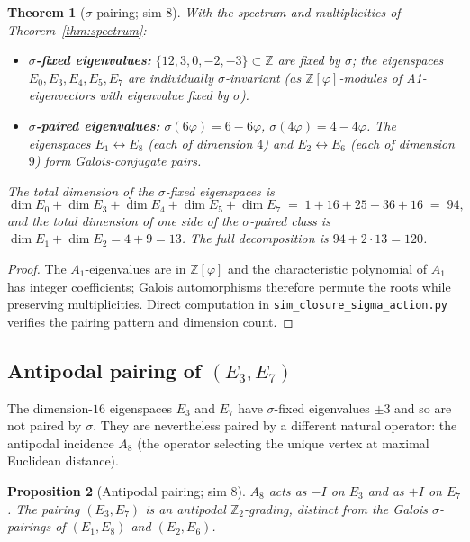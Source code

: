 \documentclass[11pt,a4paper]{article}
\newtheorem{theorem}{Theorem}
\newtheorem{proposition}[theorem]{Proposition}
\theoremstyle{definition}
\theoremstyle{remark}
\newcommand{\Z}{\mathbb{Z}}
\newcommand{\Zphi}{\Z[\varphi]}
\begin{document}
\begin{theorem}[$\sigma$-pairing; sim 8]\label{thm:sigma-pair}
With the spectrum and multiplicities of Theorem~\ref{thm:spectrum}:
\begin{itemize}
  \item \textbf{$\sigma$-fixed eigenvalues:} $\{12, 3, 0, -2, -3\} \subset \Z$ are
    fixed by $\sigma$; the eigenspaces $E_0, E_3, E_4, E_5, E_7$ are
    individually $\sigma$-invariant (as $\Zphi$-modules of A1-eigenvectors with
    eigenvalue fixed by $\sigma$).
  \item \textbf{$\sigma$-paired eigenvalues:}
    $\sigma(6\varphi) = 6-6\varphi$, $\sigma(4\varphi) = 4-4\varphi$. The
    eigenspaces $E_1 \leftrightarrow E_8$ (each of dimension $4$) and
    $E_2 \leftrightarrow E_6$ (each of dimension $9$) form Galois-conjugate
    pairs.
\end{itemize}
The total dimension of the $\sigma$-fixed eigenspaces is
\[
  \dim E_0 + \dim E_3 + \dim E_4 + \dim E_5 + \dim E_7
  \;=\; 1 + 16 + 25 + 36 + 16 \;=\; 94,
\]
and the total dimension of one side of the $\sigma$-paired class is
$\dim E_1 + \dim E_2 = 4 + 9 = 13$. The full decomposition is $94 + 2\cdot 13 = 120$.
\end{theorem}

\begin{proof}
The $A_1$-eigenvalues are in $\Zphi$ and the characteristic polynomial of
$A_1$ has integer coefficients; Galois automorphisms therefore permute the
roots while preserving multiplicities. Direct computation in
\texttt{sim\_closure\_sigma\_action.py} verifies the pairing pattern and
dimension count.
\end{proof}

\subsection{Antipodal pairing of $(E_3, E_7)$}

The dimension-$16$ eigenspaces $E_3$ and $E_7$ have $\sigma$-fixed eigenvalues
$\pm 3$ and so are not paired by $\sigma$. They are nevertheless paired by a
different natural operator: the antipodal incidence $A_8$ (the operator
selecting the unique vertex at maximal Euclidean distance).

\begin{proposition}[Antipodal pairing; sim 8]\label{prop:antipodal}
$A_8$ acts as $-I$ on $E_3$ and as $+I$ on $E_7$. The pairing
$(E_3, E_7)$ is an antipodal $\Z_2$-grading, distinct from the
Galois $\sigma$-pairings of $(E_1, E_8)$ and $(E_2, E_6)$.
\end{proposition}
\end{document}
